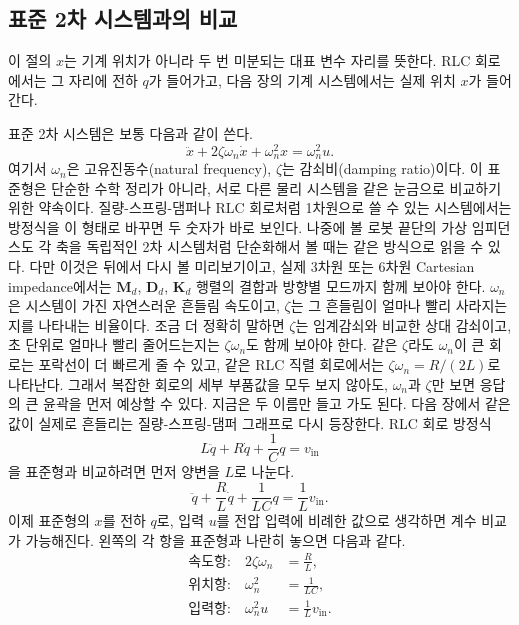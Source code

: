 \subsection{표준 2차 시스템과의 비교}

이 절의 $x$는 기계 위치가 아니라 두 번 미분되는 대표 변수 자리를 뜻한다.
RLC 회로에서는 그 자리에 전하 $q$가 들어가고, 다음 장의 기계 시스템에서는 실제 위치 $x$가 들어간다.

표준 2차 시스템은 보통 다음과 같이 쓴다.
\begin{equation}
  \ddot{x} + 2\zeta \omega_n \dot{x} + \omega_n^2 x = \omega_n^2 u.
\end{equation}
여기서 $\omega_n$은 고유진동수(natural frequency), $\zeta$는 감쇠비(damping ratio)이다.
이 표준형은 단순한 수학 정리가 아니라, 서로 다른 물리 시스템을 같은 눈금으로 비교하기 위한 약속이다.
질량-스프링-댐퍼나 RLC 회로처럼 1차원으로 쓸 수 있는 시스템에서는 방정식을 이 형태로 바꾸면 두 숫자가 바로 보인다.
나중에 볼 로봇 끝단의 가상 임피던스도 각 축을 독립적인 2차 시스템처럼 단순화해서 볼 때는 같은 방식으로 읽을 수 있다.
다만 이것은 뒤에서 다시 볼 미리보기이고, 실제 3차원 또는 6차원 Cartesian impedance에서는 $\bm{M}_d$, $\bm{D}_d$, $\bm{K}_d$ 행렬의 결합과 방향별 모드까지 함께 보아야 한다.
$\omega_n$은 시스템이 가진 자연스러운 흔들림 속도이고, $\zeta$는 그 흔들림이 얼마나 빨리 사라지는지를 나타내는 비율이다.
조금 더 정확히 말하면 $\zeta$는 임계감쇠와 비교한 상대 감쇠이고, 초 단위로 얼마나 빨리 줄어드는지는 $\zeta\omega_n$도 함께 보아야 한다.
같은 $\zeta$라도 $\omega_n$이 큰 회로는 포락선이 더 빠르게 줄 수 있고, 같은 RLC 직렬 회로에서는 $\zeta\omega_n=R/(2L)$로 나타난다.
그래서 복잡한 회로의 세부 부품값을 모두 보지 않아도, $\omega_n$과 $\zeta$만 보면 응답의 큰 윤곽을 먼저 예상할 수 있다.
지금은 두 이름만 들고 가도 된다.
다음 장에서 같은 값이 실제로 흔들리는 질량-스프링-댐퍼 그래프로 다시 등장한다.
RLC 회로 방정식
\begin{equation}
  L\ddot{q}+R\dot{q}+\frac{1}{C}q=v_{\mathrm{in}}
\end{equation}
을 표준형과 비교하려면 먼저 양변을 $L$로 나눈다.
\begin{equation}
  \ddot{q}+\frac{R}{L}\dot{q}+\frac{1}{LC}q=\frac{1}{L}v_{\mathrm{in}}.
\end{equation}
이제 표준형의 $x$를 전하 $q$로, 입력 $u$를 전압 입력에 비례한 값으로 생각하면 계수 비교가 가능해진다.
왼쪽의 각 항을 표준형과 나란히 놓으면 다음과 같다.
\begin{align}
  \text{속도항:}\quad 2\zeta\omega_n
  &=
  \frac{R}{L}, \\
  \text{위치항:}\quad \omega_n^2
  &=
  \frac{1}{LC}, \\
  \text{입력항:}\quad \omega_n^2 u
  &=
  \frac{1}{L}v_{\mathrm{in}}.
\end{align}
